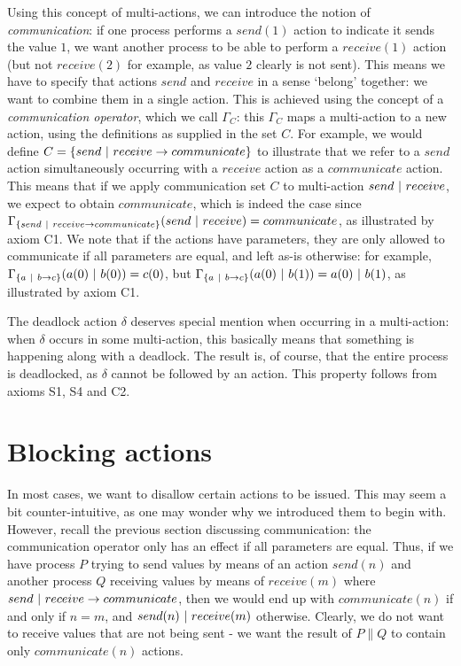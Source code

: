 Using this concept of multi-actions, we can introduce the notion of \emph{communication}: if one process performs a $send(1)$ action to indicate it sends the value $1$, we want another process to be able to perform a $receive(1)$ action (but not $receive(2)$ for example, as value $2$ clearly is not sent). This means we have to specify that actions $send$ and $receive$ in a sense `belong' together: we want to combine them in a single action. This is achieved using the concept of a \emph{communication operator}, which we call $\Gamma_C$: this $\Gamma_C$ maps a multi-action to a new action, using the definitions as supplied in the set $C$. For example, we would define $C = \{ send ~|~ receive \rightarrow communicate \}$ to illustrate that we refer to a $send$ action simultaneously occurring with a $receive$ action as a $communicate$ action. This means that if we apply communication set $C$ to multi-action $send ~|~ receive$, we expect to obtain $communicate$, which is indeed the case since $\Gamma_{\{ send ~|~ receive \rightarrow communicate \}} (send ~|~ receive) = communicate$, as illustrated by axiom C1. We note that if the actions have parameters, they are only allowed to communicate if all parameters are equal, and left as-is otherwise: for example, $\Gamma_{ \{ a ~|~ b \rightarrow c \}} (a(0) ~|~ b(0)) = c(0)$, but $\Gamma_{ \{ a ~|~ b \rightarrow c \}} (a(0) ~|~ b(1)) = a(0) ~|~ b(1)$, as illustrated by axiom C1.

The deadlock action $\delta$ deserves special mention when occurring in a multi-action: when $\delta$ occurs in some multi-action, this basically means that something is happening along with a deadlock. The result is, of course, that the entire process is deadlocked, as $\delta$ cannot be followed by an action. This property follows from axioms S1, S4 and C2.

\section{Blocking actions}

In most cases, we want to disallow certain actions to be issued. This may seem a bit counter-intuitive, as one may wonder why we introduced them to begin with. However, recall the previous section discussing communication: the communication operator only has an effect if all parameters are equal. Thus, if we have process $P$ trying to send values by means of an action $send(n)$ and another process $Q$ receiving values by means of $receive(m)$ where $send ~|~ receive \rightarrow communicate$, then we would end up with $communicate(n)$ if and only if $n = m$, and $send(n) ~|~ receive(m)$ otherwise. Clearly, we do not want to receive values that are not being sent - we want the result of $P \parallel Q$ to contain only $communicate(n)$ actions.

